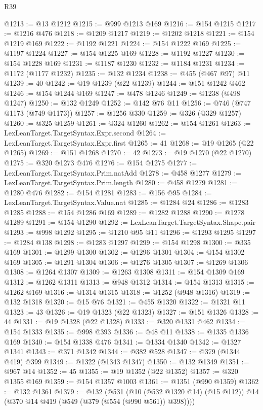 \begin{lexlean}{R39}
\begin{coremodule}
@1213 := @13 @1212
@1215 := @999 @1213 @169
@1216 := @154 @1215
@1217 := @1216 @476
@1218 := @1209 @1217
@1219 := @1202 @1218
@1221 := @154 @1219 @169
@1222 := @1192 @1221
@1224 := @154 @1222 @169
@1225 := @1197 @1224
@1227 := @154 @1225 @169
@1228 := @1192 @1227
@1230 := @154 @1228 @169
@1231 := @1187 @1230
@1232 := @1184 @1231
@1234 := @1172 (@1177 @1232)
@1235 := @132 @1234
@1238 := @455 (@467 @97) @11
@1239 := 40
@1242 := @19 @1239 (@22 @1239)
@1244 := @151 @1242 @462
@1246 := @154 @1244 @169
@1247 := @478 @1246
@1249 := @1238 (@498 @1247)
@1250 := @132 @1249
@1252 := @142 @76 @11
@1256 := @746 (@747 @1173 (@749 @1173))
@1257 := @1256 @330
@1259 := @326 (@329 @1257)
@1260 := @325 @1259
@1261 := @324 @1260
@1262 := @154 @1261
@1263 := LexLeanTarget.TargetSyntax.Expr.second
@1264 := LexLeanTarget.TargetSyntax.Expr.first
@1265 := 41
@1268 := @19 @1265 (@22 @1265)
@1269 := @151 @1268
@1270 := 42
@1273 := @19 @1270 (@22 @1270)
@1275 := @320 @1273 @476
@1276 := @154 @1275
@1277 := LexLeanTarget.TargetSyntax.Prim.natAdd
@1278 := @458 @1277
@1279 := LexLeanTarget.TargetSyntax.Prim.length
@1280 := @458 @1279
@1281 := @1280 @476
@1282 := @154 @1281
@1283 := @156 @95
@1284 := LexLeanTarget.TargetSyntax.Value.nat
@1285 := @1284 @24
@1286 := @1283 @1285
@1288 := @154 @1286 @169
@1289 := @1282 @1288
@1290 := @1278 @1289
@1291 := @154 @1290
@1292 := LexLeanTarget.TargetSyntax.Shape.pair
@1293 := @998 @1292
@1295 := @1210 @95 @11
@1296 := @1293 @1295
@1297 := @1284 @138
@1298 := @1283 @1297
@1299 := @154 @1298
@1300 := @335 @169
@1301 := @1299 @1300
@1302 := @1296 @1301
@1304 := @154 @1302 @169
@1305 := @1291 @1304
@1306 := @1276 @1305
@1307 := @1269 @1306
@1308 := @1264 @1307
@1309 := @1263 @1308
@1311 := @154 @1309 @169
@1312 := @1262 @1311
@1313 := @948 @1312
@1314 := @154 @1313
@1315 := @1262 @169
@1316 := @1314 @1315
@1318 := @1252 (@948 @1316)
@1319 := @132 @1318
@1320 := @15 @76
@1321 := @455 @1320
@1322 := @1321 @11
@1323 := 43
@1326 := @19 @1323 (@22 @1323)
@1327 := @151 @1326
@1328 := 44
@1331 := @19 @1328 (@22 @1328)
@1333 := @320 @1331 @462
@1334 := @154 @1333
@1335 := @998 @393
@1336 := @48 @11
@1338 := @1335 @1336 @169
@1340 := @154 @1338 @476
@1341 := @1334 @1340
@1342 := @1327 @1341
@1343 := @371 @1342
@1344 := @382 @528
@1347 := @379 (@1344 @419) @399
@1349 := @1322 (@1343 @1347)
@1350 := @132 @1349
@1351 := @967 @14
@1352 := 45
@1355 := @19 @1352 (@22 @1352)
@1357 := @320 @1355 @169
@1359 := @154 @1357 @1003
@1361 := @1351 (@990 @1359)
@1362 := @132 @1361
@1379 := @132
    (@531
      (@10 (@532 @1320 @14) (@15 @112))
      @14
      (@370 @14 @419 (@549 (@379 (@554 (@990 @561)) @398))))

\end{coremodule}
\end{lexlean}
